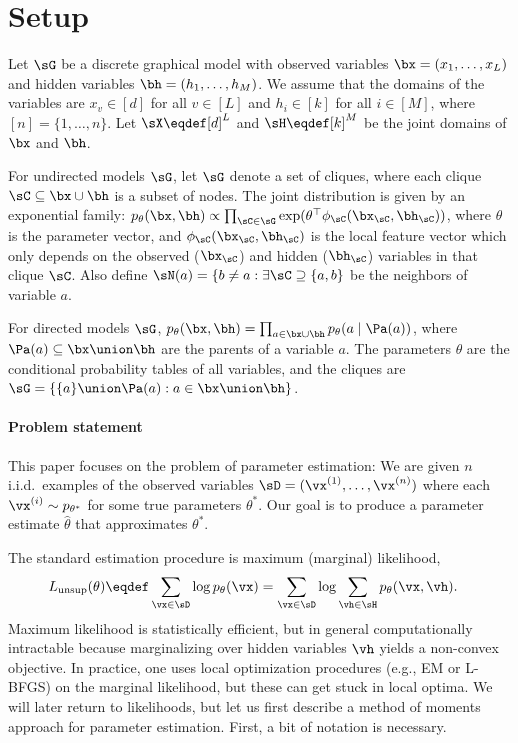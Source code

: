 \section{Setup}
\label{sec:setup}

Let $\sG$ be a discrete graphical model with
observed variables $\bx = (x_1, \dots, x_L)$ and
hidden variables $\bh = (h_{1}, \dots, h_M)$.
We assume that the domains of the variables
are $x_v \in [d]$ for all $v \in [L]$
and $h_i \in [k]$ for all $i \in [M]$,
where $[n] = \{ 1, \dots, n \}$.
Let $\sX \eqdef [d]^L$ and $\sH \eqdef [k]^{M}$ be the joint domains of $\bx$ and $\bh$.

For undirected models $\sG$,
let $\sG$ denote a set of cliques, where each clique $\sC \subseteq \bx \cup \bh$ is a subset of nodes.
The joint distribution is given by an exponential family:
  $p_\theta(\bx,\bh) \propto \prod_{\sC \in \sG} \exp(\theta^\top\phi_\sC(\bx_\sC, \bh_\sC))$,
  where $\theta$ is the parameter vector,
  and $\phi_\sC(\bx_\sC, \bh_\sC)$ is the local feature vector
  which only depends on the observed ($\bx_\sC$) and hidden ($\bh_\sC$) variables in that clique $\sC$.
  Also define $\sN(a) = \{ b \neq a : \exists \sC \supseteq \{ a, b \}$ be the neighbors of variable $a$.

For directed models $\sG$,
  $p_\theta(\bx,\bh) = \prod_{a \in \bx \cup \bh} p_\theta(a \mid \Pa(a))$,
  where $\Pa(a) \subseteq \bx \union \bh$ are the parents of a variable $a$.
  The parameters $\theta$ are the conditional probability tables of all variables,
  and the cliques are $\sG = \{ \{ a \} \union \Pa(a) : a \in \bx \union \bh \}$.

\paragraph{Problem statement}

This paper focuses on the problem of parameter estimation:
We are given $n$ i.i.d.~examples of the observed variables $\sD
  = (\vx^{(1)}, \dots, \vx^{(n)})$ where each $\vx^{(i)} \sim p_{\theta^*}$ for
  some true parameters $\theta^*$.
Our goal is to produce a parameter estimate $\hat\theta$ that
  approximates $\theta^*$.

The standard estimation procedure is maximum (marginal) likelihood,
  \begin{align*}
    L_\text{unsup}(\theta) &\eqdef \sum_{\vx \in \sD} \log p_\theta(\vx)
        =  \sum_{\vx \in \sD} \log \sum_{\vh \in \sH} p_\theta(\vx,\vh).
  \end{align*}
  Maximum likelihood is statistically efficient,
  but in general computationally intractable
  because marginalizing over hidden variables $\vh$ yields a non-convex objective.
In practice, one uses local optimization procedures (e.g., EM
  or L-BFGS) on the marginal likelihood, but these can get stuck in local
  optima.
We will later return to likelihoods, but let us first
describe a method of moments approach for parameter estimation.
First, a bit of notation is necessary.

